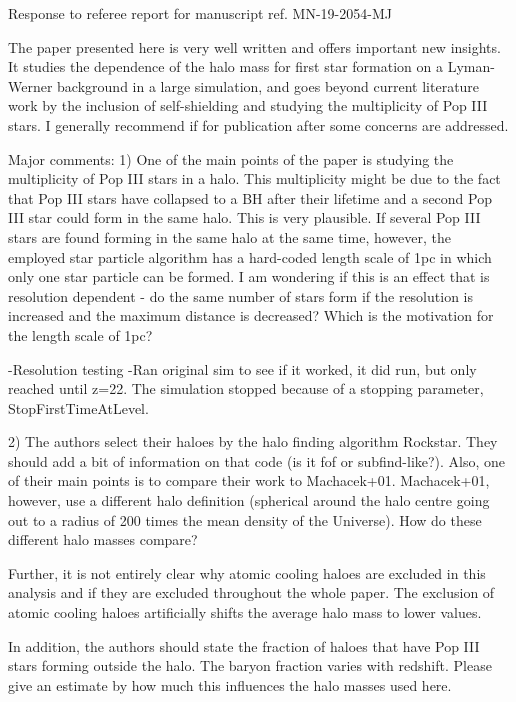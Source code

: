 \documentclass[11pt]{article}
\begin{document}
\begin{center} 
\bfseries{
\begin{large}
  Response to referee report for manuscript ref. MN-19-2054-MJ
\end{large}
}
\end{center}

\begin{referee}
The paper presented here is very well written and offers important new insights. 
It studies the dependence of the halo mass for first star formation on a 
Lyman-Werner background in a large simulation, and goes beyond current literature
 work by the inclusion of self-shielding and studying the multiplicity of Pop III 
 stars. I generally recommend if for publication after some concerns are 
 addressed.
\end{referee}


\begin{referee}
Major comments:
1) One of the main points of the paper is studying the multiplicity of Pop III 
stars in a halo. This multiplicity might be due to the fact that Pop III stars 
have collapsed to a BH after their lifetime and a second Pop III star could form
 in the same halo. This is very plausible. If several Pop III stars are found 
 forming in the same halo at the same time, however, the employed star particle 
 algorithm has a hard-coded length scale of 1pc in which only one star particle 
 can be formed. I am wondering if this is an effect that is resolution dependent 
 - do the same number of stars form if the resolution is increased and the 
 maximum distance is decreased? Which is the motivation for the length scale of 
 1pc?
\end{referee}

-Resolution testing
-Ran original sim to see if it worked, it did run, but only reached until z=22. The simulation stopped because of a stopping parameter, StopFirstTimeAtLevel. 



\begin{referee}
2) The authors select their haloes by the halo finding algorithm Rockstar. They 
should add a bit of information on that code (is it fof or subfind-like?). Also,
 one of their main points is to compare their work to Machacek+01. Machacek+01, 
 however, use a different halo definition (spherical around the halo centre 
 going out to a radius of 200 times the mean density of the Universe). How do 
 these different halo masses compare?

Further, it is not entirely clear why atomic cooling haloes are excluded in this
 analysis and if they are excluded throughout the whole paper. The exclusion of 
 atomic cooling haloes artificially shifts the average halo mass to lower 
 values.

In addition, the authors should state the fraction of haloes that have Pop III 
stars forming outside the halo. The baryon fraction varies with redshift. Please
 give an estimate by how much this influences the halo masses used here.
\end{referee}
\end{document}
